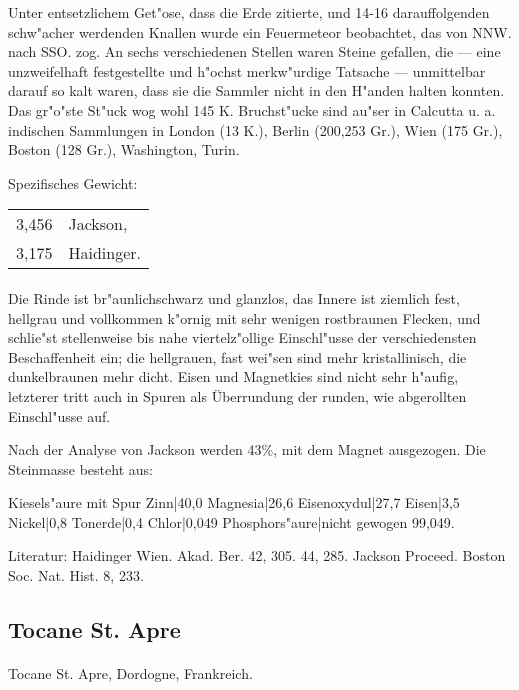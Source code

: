 \documentclass[a4paper, 11pt, oneside]{article}
\begin{document}
Unter entsetzlichem Get"ose, dass die Erde zitierte, und 14-16 darauffolgenden schw"acher werdenden Knallen wurde ein Feuermeteor beobachtet, das von NNW. nach SSO. zog. An sechs verschiedenen Stellen waren Steine gefallen, die --- eine unzweifelhaft festgestellte und h"ochst merkw"urdige Tatsache --- unmittelbar darauf so kalt waren, dass sie die Sammler nicht in den H"anden halten konnten. Das gr"o"ste St"uck wog wohl 145 K. Bruchst"ucke sind au"ser in Calcutta u. a. indischen Sammlungen in London (13 K.), Berlin (200,253 Gr.), Wien (175 Gr.), Boston (128 Gr.), Washington, Turin.

Spezifisches Gewicht:  
\begin{table}[!ht]
    \centering
    \begin{tabular}{l l}
        3,456 & Jackson,\\
        3,175 & Haidinger.
    \end{tabular}
\end{table}
\paragraph{}
Die Rinde ist br"aunlichschwarz und glanzlos, das Innere ist ziemlich fest, hellgrau und vollkommen k"ornig mit sehr wenigen rostbraunen Flecken, und schlie"st stellenweise bis nahe viertelz"ollige Einschl"usse der verschiedensten Beschaffenheit ein; die hellgrauen, fast wei"sen sind mehr kristallinisch, die dunkelbraunen mehr dicht. Eisen und Magnetkies sind nicht sehr h"aufig, letzterer tritt auch in Spuren als Überrundung der runden, wie abgerollten Einschl"usse auf.

Nach der Analyse von Jackson werden 43\%, mit dem Magnet ausgezogen. Die Steinmasse besteht aus:

Kiesels"aure mit Spur Zinn|40,0  
Magnesia|26,6  
Eisenoxydul|27,7  
Eisen|3,5  
Nickel|0,8  
Tonerde|0,4  
Chlor|0,049  
Phosphors"aure|nicht gewogen  
99,049.

Literatur: Haidinger Wien. Akad. Ber. 42, 305. 44, 285. Jackson Proceed. Boston Soc. Nat. Hist. 8, 233.

\subsection{Tocane St. Apre}
\normalsize
\paragraph{}
Tocane St. Apre, Dordogne, Frankreich.
\end{document}
